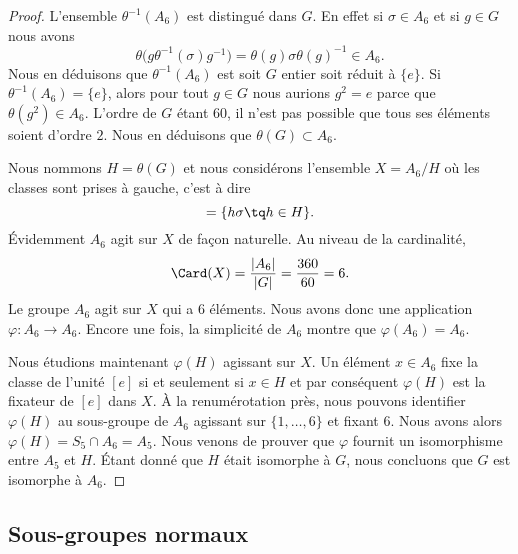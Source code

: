 \begin{proof}
    L'ensemble \( \theta^{-1}(A_6)\) est distingué dans \( G\). En effet si \( \sigma\in A_6\) et si \( g\in G\) nous avons
    \begin{equation}
        \theta\big( g\theta^{-1}(\sigma)g^{-1} \big)=\theta(g)\sigma \theta(g)^{-1}\in A_6.
    \end{equation}
    Nous en déduisons que \( \theta^{-1}(A_6)\) est soit \( G\) entier soit réduit à \( \{ e \}\). Si \( \theta^{-1}(A_6)=\{ e \}\), alors pour tout \( g\in G\) nous aurions \( g^2=e\) parce que \( \theta(g^2)\in A_6\). L'ordre de \( G\) étant \( 60\), il n'est pas possible que tous ses éléments soient d'ordre \( 2\). Nous en déduisons que \( \theta(G)\subset A_6\).

    Nous nommons \( H=\theta(G)\) et nous considérons l'ensemble \( X=A_6/H\) où les classes sont prises à gauche, c'est à dire 
    \begin{equation}
        [\sigma]=\{ h\sigma\tq h\in H \}.
    \end{equation}
    Évidemment \( A_6\) agit sur \( X\) de façon naturelle. Au niveau de la cardinalité,
    \begin{equation}
        \Card(X)=\frac{ | A_6 | }{ | G | }=\frac{ 360 }{ 60 }=6.
    \end{equation}
    Le groupe \( A_6\) agit sur \( X\) qui a \( 6\) éléments. Nous avons donc une application \( \varphi\colon A_6\to A_6\). Encore une fois, la simplicité de \( A_6\) montre que \( \varphi(A_6)=A_6\).

    Nous étudions maintenant \( \varphi(H)\) agissant sur \( X\). Un élément \( x\in A_6\) fixe la classe de l'unité \( [e]\) si et seulement si \( x\in H\) et par conséquent \( \varphi(H)\) est la fixateur de \( [e]\) dans \( X\). À la renumérotation près, nous pouvons identifier \( \varphi(H)\) au sous-groupe de \( A_6\) agissant sur \( \{ 1,\ldots, 6 \}\) et fixant \( 6\). Nous avons alors \( \varphi(H)=S_5\cap A_6=A_5\). Nous venons de prouver que \( \varphi\) fournit un isomorphisme entre \( A_5\) et \( H\). Étant donné que \( H\) était isomorphe à \( G\), nous concluons que \( G\) est isomorphe à \( A_6\).
\end{proof}

\subsection{Sous-groupes normaux}

